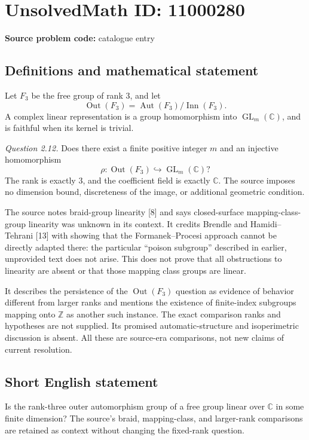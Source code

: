 \documentclass[11pt]{article}
\newcommand{\Z}{\mathbb{Z}}
\newcommand{\C}{\mathbb{C}}
\begin{document}
\section*{UnsolvedMath ID: 11000280}
\textbf{Source problem code:} catalogue entry
\subsection{Definitions and mathematical statement}
Let \(F_3\) be the free group of rank \(3\), and let
\[
 \operatorname{Out}(F_3)=\operatorname{Aut}(F_3)/\operatorname{Inn}(F_3).
\]
A complex linear representation is a group homomorphism into \(\operatorname{GL}_m(\C)\), and is faithful when its kernel is trivial.

\emph{Question 2.12.} Does there exist a finite positive integer \(m\) and an injective homomorphism
\[
 \rho:\operatorname{Out}(F_3)\hookrightarrow\operatorname{GL}_m(\C)?
\]
The rank is exactly \(3\), and the coefficient field is exactly \(\C\). The source imposes no dimension bound, discreteness of the image, or additional geometric condition.

The source notes braid-group linearity [8] and says closed-surface mapping-class-group linearity was unknown in its context. It credits Brendle and Hamidi--Tehrani [13] with showing that the Formanek--Procesi approach cannot be directly adapted there: the particular ``poison subgroup'' described in earlier, unprovided text does not arise. This does not prove that all obstructions to linearity are absent or that those mapping class groups are linear.

It describes the persistence of the \(\operatorname{Out}(F_3)\) question as evidence of behavior different from larger ranks and mentions the existence of finite-index subgroups mapping onto \(\Z\) as another such instance. The exact comparison ranks and hypotheses are not supplied. Its promised automatic-structure and isoperimetric discussion is absent. All these are source-era comparisons, not new claims of current resolution.
\subsection{Short English statement}
Is the rank-three outer automorphism group of a free group linear over \(\C\) in some finite dimension? The source's braid, mapping-class, and larger-rank comparisons are retained as context without changing the fixed-rank question.
\end{document}
